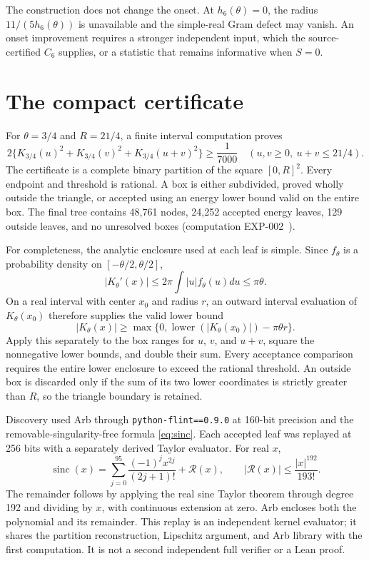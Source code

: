 ﻿\documentclass[11pt]{article}
\theoremstyle{remark}
\begin{document}
The construction does not change the onset. At $h_6(\theta)=0$, the radius
$11/(5h_6(\theta))$ is unavailable and the simple-real Gram defect may vanish.
An onset improvement requires a stronger independent input, which the
source-certified $C_6$ supplies, or a statistic that remains informative when
$S=0$.

\section{The compact certificate}\label{sec:certificate}

For $\theta=3/4$ and $R=21/4$, a finite interval computation proves
\begin{equation}\label{eq:numericalgap}
 2\{K_{3/4}(u)^2+K_{3/4}(v)^2+K_{3/4}(u+v)^2\}\ge\frac1{7000}
 \quad(u,v\ge0,\ u+v\le21/4).
\end{equation}
The certificate is a complete binary partition of the square $[0,R]^2$.
Every endpoint and threshold is rational. A box is either subdivided,
proved wholly outside the triangle, or accepted using an energy lower
bound valid on the entire box. The final tree contains 48,761 nodes,
24,252 accepted energy leaves, 129 outside leaves, and no unresolved
boxes (computation EXP-002~\cite{Record}).

For completeness, the analytic enclosure used at each leaf is simple.
Since $f_\theta$ is a probability density on $[-\theta/2,\theta/2]$,
\begin{equation}\label{eq:lipschitz}
 |K_\theta'(x)|\le2\pi\int|u|f_\theta(u)du\le\pi\theta.
\end{equation}
On a real interval with center $x_0$ and radius $r$, an outward interval
evaluation of $K_\theta(x_0)$ therefore supplies the valid lower bound
\[
 |K_\theta(x)|\ge
 \max\{0,\operatorname{lower}(|K_\theta(x_0)|)-\pi\theta r\}.
\]
Apply this separately to the box ranges for $u$, $v$, and $u+v$, square
the nonnegative lower bounds, and double their sum. Every acceptance
comparison requires the entire lower enclosure to exceed the rational
threshold. An outside box is discarded only if the sum of its two lower
coordinates is strictly greater than $R$, so the triangle boundary is
retained.

Discovery used Arb through \texttt{python-flint==0.9.0} at 160-bit
precision and the removable-singularity-free formula \eqref{eq:sinc}.
Each accepted leaf was replayed at 256 bits with a separately derived
Taylor evaluator. For real $x$,
\begin{equation}\label{eq:taylor}
 \operatorname{sinc}(x)=\sum_{j=0}^{95}\frac{(-1)^jx^{2j}}{(2j+1)!}
 +\mathcal R(x),\qquad
 |\mathcal R(x)|\le\frac{|x|^{192}}{193!}.
\end{equation}
The remainder follows by applying the real sine Taylor theorem through
degree 192 and dividing by $x$, with continuous extension at zero.
Arb encloses both the polynomial and its remainder. This replay is an
independent kernel evaluator; it shares the partition reconstruction,
Lipschitz argument, and Arb library with the first computation. It is
not a second independent full verifier or a Lean proof.
\end{document}
